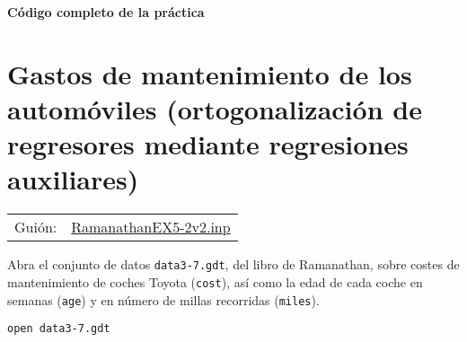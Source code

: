 \documentclass[11pt]{article}
\begin{document}
\clearpage
\vspace{10pt}
\noindent
\textbf{Código completo de la práctica}
\vspace{10pt}

\clearpage


\section{Gastos de mantenimiento de los automóviles (ortogonalización de regresores mediante regresiones auxiliares)}
\label{sec:org193f6d4}
\begin{center}
\begin{tabular}{ll}
Guión: & \href{https://github.com/mbujosab/Ectr/tree/master/Practicas/Gretl/scripts/RamanathanEX5-2v2.inp}{RamanathanEX5-2v2.inp}\\
\end{tabular}
\end{center}

Abra el conjunto de datos \texttt{data3-7.gdt}, del libro de Ramanathan,
sobre costes de mantenimiento de coches Toyota (\texttt{cost}), así como la
edad de cada coche en semanas (\texttt{age}) y en número de millas recorridas
(\texttt{miles}).
{\vspace{0pt} \color{gray!70!black}
\begin{verbatim}
open data3-7.gdt
\end{verbatim}
}
\end{document}
